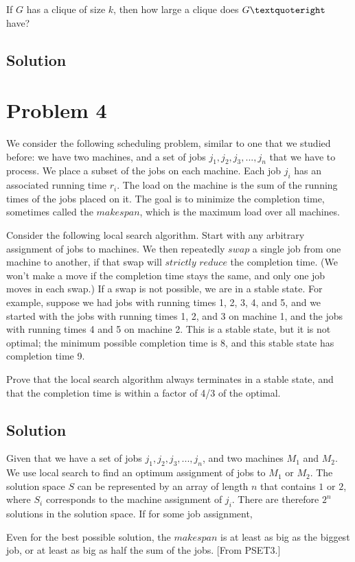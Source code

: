 \documentclass[11pt]{article}
\begin{document}
If $G$ has a clique of size $k$, then how large a clique does $G\textquoteright$ have?

\subsection{Solution}

\section{Problem 4}

We consider the following scheduling problem, similar to one that we studied before: we have two machines, and a set of jobs $j_1, j_2, j_3,..., j_n$ that we have to process. We place a subset of the jobs on each machine. Each job $j_i$ has an associated running time $r_i$. The load on the machine is the sum of the running times of the jobs placed on it. The goal is to minimize the completion time, sometimes called the $makespan$, which is the maximum load over all machines.

Consider the following local search algorithm. Start with any arbitrary assignment of jobs to machines. We then repeatedly $swap$ a single job from one machine to another, if that swap will $strictly$ $reduce$ the completion time. (We won't make a move if the completion time stays the same, and only one job moves in each swap.) If a swap is not possible, we are in a stable state. For example, suppose we had jobs with running times 1, 2, 3, 4, and 5, and we started with the jobs with running times 1, 2, and 3 on machine 1, and the jobs with running times 4 and 5 on machine 2. This is a stable state, but it is not optimal; the minimum possible completion time is 8, and this stable state has completion time 9.

Prove that the local search algorithm always terminates in a stable state, and that the completion time is within a factor of 4/3 of the optimal.

\subsection{Solution}
Given that we have a set of jobs $j_1, j_2, j_3,..., j_n$, and two machines $M_1$ and $M_2$. We use local search to find an optimum assignment of jobs to $M_1$ or $M_2$. The solution space $S$ can be represented by an array of length $n$ that contains $1$ or $2$, where $S_i$ corresponds to the machine assignment of $j_i$. There are therefore $2^n$ solutions in the solution space. 
	If for some job assignment, 
	
	Even for the best possible solution, the $makespan$ is at least as big as the biggest job, or at least as big as half the sum of the jobs. [From PSET3.]
\end{document}
